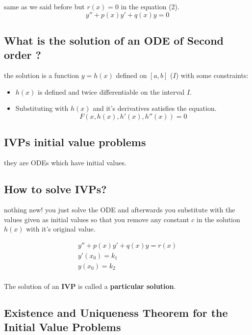 \documentclass[11pt]{article}
\theoremstyle{definition}
\begin{document}
same as we said before but $r(x)=0$ in the equation (2).
\begin{equation}
\label{H}
    y''+p(x)y'+q(x)y=0
\end{equation}

\subsection{What  is the solution of an ODE of Second order ?}
the solution is a function $y=h(x)$ defined on $[a,b]$ ($I$) with some constraints: 
\begin{itemize}
    \item $h(x)$ is defined and twice differentiable on the interval $I$.
    \item Substituting with $h(x)$ and it's derivatives satisfies the equation.
    \begin{equation}
        F(x, h(x), h'(x), h''(x)) = 0
    \end{equation}
    
\end{itemize}

\subsection{IVPs initial value problems}

they are ODEs which have initial values.

\subsection{How to solve IVPs?}
nothing new! you just solve the ODE and afterwards you substitute with the values given as initial values so that you remove any constant $c$ in the solution $h(x)$ with it's original value. 
\begin{shaded}
\begin{equation} 
\begin{split} 
  y''+p(x)y'+q(x)y=r(x) \\
  y'(x_0) = k_1 \\
  y(x_0) = k_2\\
  \end{split} 
\end{equation}
\end{shaded}

The solution of an \textbf{IVP} is called a \textbf{particular solution}.
\subsection{Existence and Uniqueness Theorem for the Initial Value Problems}
\end{document}
